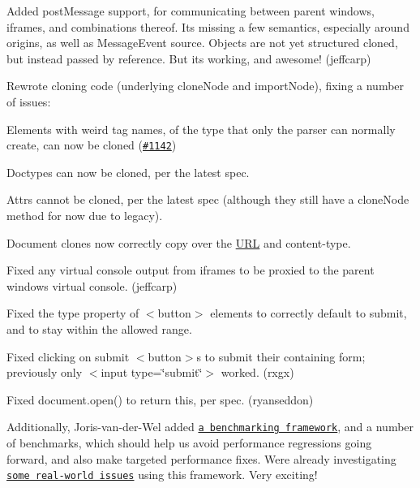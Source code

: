 \begin{DoxyItemize}
\item Added {\ttfamily post\+Message} support, for communicating between parent windows, iframes, and combinations thereof. It\textquotesingle{}s missing a few semantics, especially around origins, as well as Message\+Event source. Objects are not yet structured cloned, but instead passed by reference. But it\textquotesingle{}s working, and awesome! (jeffcarp)
\item Rewrote cloning code (underlying {\ttfamily clone\+Node} and {\ttfamily import\+Node}), fixing a number of issues\+:
\begin{DoxyItemize}
\item Elements with weird tag names, of the type that only the parser can normally create, can now be cloned (\href{https://github.com/tmpvar/jsdom/issues/1142}{\tt \#1142})
\item Doctypes can now be cloned, per the latest spec.
\item Attrs cannot be cloned, per the latest spec (although they still have a {\ttfamily clone\+Node} method for now due to legacy).
\item Document clones now correctly copy over the \mbox{\hyperlink{namespace_u_r_l}{U\+RL}} and content-\/type.
\end{DoxyItemize}
\item Fixed any virtual console output from iframes to be proxied to the parent window\textquotesingle{}s virtual console. (jeffcarp)
\item Fixed the {\ttfamily type} property of {\ttfamily $<$button$>$} elements to correctly default to {\ttfamily submit}, and to stay within the allowed range.
\item Fixed clicking on submit {\ttfamily $<$button$>$}s to submit their containing form; previously only {\ttfamily $<$input type=\char`\"{}submit\char`\"{}$>$} worked. (rxgx)
\item Fixed {\ttfamily document.\+open()} to return {\ttfamily this}, per spec. (ryanseddon)
\end{DoxyItemize}

Additionally, Joris-\/van-\/der-\/\+Wel added \href{https://github.com/tmpvar/jsdom/blob/master/Contributing.md#running-the-benchmarks}{\tt a benchmarking framework}, and a number of benchmarks, which should help us avoid performance regressions going forward, and also make targeted performance fixes. We\textquotesingle{}re already investigating \href{https://github.com/tmpvar/jsdom/issues/1156}{\tt some real-\/world issues} using this framework. Very exciting!

